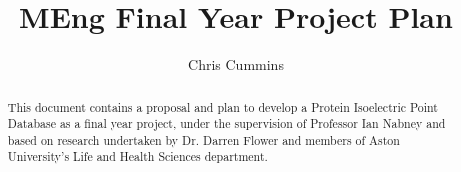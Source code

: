 
\title{MEng Final Year Project Plan}
\author{Chris Cummins}


\maketitle

\begin{abstract}
\noindent
This document contains a proposal and plan to develop a Protein Isoelectric
Point Database as a final year project, under the supervision of Professor Ian
Nabney and based on research undertaken by Dr. Darren Flower and members of
Aston University's Life and Health Sciences department.
\end{abstract}
\newpage

\tableofcontents
\listoffigures
\listoftables

\newpage
{}
